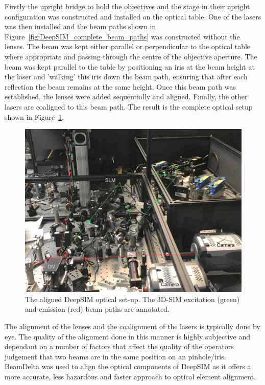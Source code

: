 Firstly the upright bridge to hold the objectives and the stage in their upright configuration was constructed and installed on the optical table. One of the lasers was then installed and the beam paths shown in Figure~\ref{fig:DeepSIM_complete_beam_paths} was constructed without the lenses. The beam was kept either parallel or perpendicular to the optical table where appropriate and passing through the centre of the objective aperture. The beam was kept parallel to the table by positioning an iris at the beam height at the laser and 'walking' this iris down the beam path, ensuring that after each reflection the beam remains at the same height. Once this beam path was established, the lenses were added sequentially and aligned. Finally, the other lasers are coaligned to this beam path. The result is the complete optical setup shown in Figure~\ref{fig:DeepSIM_physical_optics}.

\begin{figure}[h]
	\centering
	\includegraphics[width=\textwidth]{images/DeepSIM_SIM_path_annotated_bright.jpg}
	\caption[The aligned DeepSIM optical set-up.]{The aligned DeepSIM optical set-up. The 3D-SIM excitation (green) and emission (red) beam paths are annotated.}
	\label{fig:DeepSIM_physical_optics}
\end{figure}

The alignment of the lenses and the coalignment of the lasers is typically done by eye. The quality of the alignment done in this manner is highly subjective and dependant on a number of factors that affect the quality of the operators judgement that two beams are in the same position on an pinhole/iris. BeamDelta was used to align the optical components of DeepSIM as it offers a more accurate, less hazardous and faster approach to optical element alignment.\cite{dobbie2019beamdelta}

